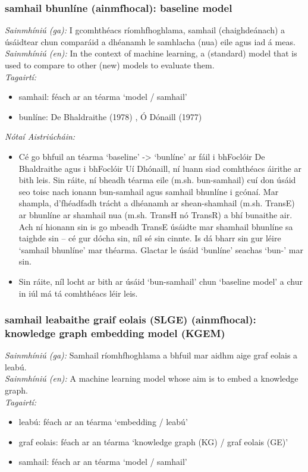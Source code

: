 \subsubsection*{samhail bhunlíne (ainmfhocal): baseline model}
 \noindent \textit{Sainmhíniú (ga):} I gcomhthéacs ríomhfhoghlama, samhail (chaighdeánach) a úsáidtear chun comparáid a dhéanamh le samhlacha (nua) eile agus iad á meas.
\\
 \noindent \textit{Sainmhíniú (en):} In the context of machine learning, a (standard) model that is used to compare to other (new) models to evaluate them.
\\
 \noindent \textit{Tagairtí:}
\begin{itemize}
	\item samhail: féach ar an téarma `model / samhail'
	\item bunlíne: De Bhaldraithe (1978) \cite{de-bhaldraithe}, Ó Dónaill (1977) \cite{odonaill}
\end{itemize}

 \noindent \textit{Nótaí Aistriúcháin:}
\begin{itemize}
	\item Cé go bhfuil an téarma `baseline' -> `bunlíne' ar fáil i bhFoclóir De Bhaldraithe agus i bhFoclóir Uí Dhónaill, ní luann siad comhthéacs áirithe ar bith leis. Sin ráite, ní bheadh téarma eile (m.sh. bun-samhail) cuí don úsáid seo toisc nach ionann bun-samhail agus samhail bhunlíne i gcónaí. Mar shampla, d'fhéadfadh trácht a dhéanamh ar shean-shamhail (m.sh. TransE) ar bhunlíne ar shamhail nua (m.sh. TransH nó TransR) a bhí bunaithe air. Ach ní hionann sin is go mbeadh TransE úsáidte mar shamhail bhunlíne sa taighde sin -- cé gur dócha sin, níl sé sin cinnte. Is dá bharr sin gur léire `samhail bhunlíne' mar théarma. Glactar le úsáid `bunlíne' seachas `bun-' mar sin.
	\item Sin ráite, níl locht ar bith ar úsáid `bun-samhail' chun `baseline model' a chur in iúl má tá comhthéacs léir leis.
\end{itemize}


\subsubsection*{samhail leabaithe graif eolais (SLGE) (ainmfhocal): knowledge graph embedding model (KGEM)}
 \noindent \textit{Sainmhíniú (ga):} Samhail ríomhfhoghlama a bhfuil mar aidhm aige graf eolais a leabú.
\\
 \noindent \textit{Sainmhíniú (en):} A machine learning model whose aim is to embed a knowledge graph.
\\
 \noindent \textit{Tagairtí:}
\begin{itemize}
	\item leabú: féach ar an téarma `embedding / leabú'
	\item graf eolais: féach ar an téarma `knowledge graph (KG) / graf eolais (GE)'
	\item samhail: féach ar an téarma `model / samhail'
\end{itemize}


